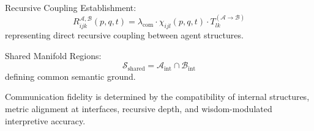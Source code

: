 Recursive Coupling Establishment:
\begin{equation}
R_{ijk}^{\mathcal{A},\mathcal{B}}(p, q, t) = \lambda_{\mathrm{com}} \cdot \chi_{ijl}(p, q, t) \cdot T_{lk}^{(\mathcal{A} \to \mathcal{B})}
\end{equation}
representing direct recursive coupling between agent structures.

Shared Manifold Regions:
\begin{equation}
\mathcal{S}_{\mathrm{shared}} = \mathcal{A}_{\mathrm{int}} \cap \mathcal{B}_{\mathrm{int}}
\end{equation}
defining common semantic ground.

Communication fidelity is determined by the compatibility of internal structures, metric alignment at interfaces, recursive depth, and wisdom-modulated interpretive accuracy. 
